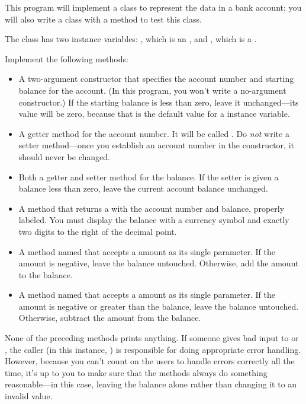 \begin{exercise}
This program will implement a class to represent the data in a bank account; you will also write a class with a  method to test this class.

The  class has two  instance variables:  , which is an , and  , which is a .

Implement the following methods:

\begin{itemize}
\item A two-argument constructor that specifies the account number and starting balance for the account. (In this program, you won't write a no-argument constructor.) If the starting balance is less than zero, leave it unchanged---its value will be zero, because that is the default value for a  instance variable.

\item A getter method for the account number. It will be called . Do {\em not} write a setter method---once you establish an account number in the constructor, it should never be changed.

\item Both a getter and setter method for the balance. If the setter is given a balance less than zero, leave the current account balance unchanged.

\item A  method that returns a  with the account number and balance, properly labeled. You must display the balance with a currency symbol and exactly two digits to the right of the decimal point.

\item A  method named  that accepts a  amount as its single parameter. If the amount is negative, leave the balance untouched. Otherwise, add the amount to the balance.

\item A  method named  that accepts a  amount as its single parameter. If the amount is negative or greater than the balance, leave the balance untouched. Otherwise, subtract the amount from the balance.

\end{itemize}

None of the preceding methods prints anything. If someone gives bad input to  or , the caller (in this instance, ) is responsible for doing appropriate error handling. However, because you can't count on the users to handle errors correctly all the time, it's up to you to make sure that the methods always do something reasonable---in this case, leaving the balance alone rather than changing it to an invalid value.


\end{exercise}
